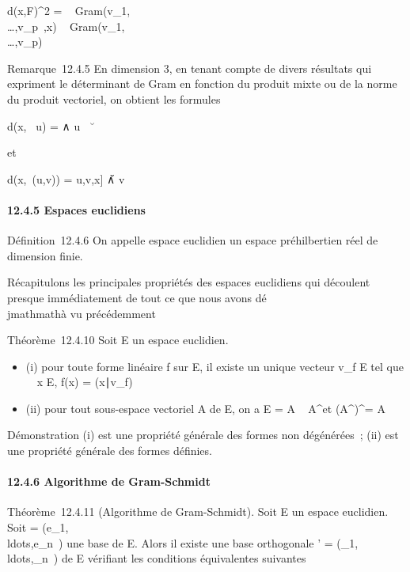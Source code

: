 \documentclass[]{article}
\begin{document}
d(x,F)^2 =
~
Gram(v_1,\\\ldots,v_p~,x)
\over
{}~
Gram(v_1,\\\ldots,v_p)~

Remarque~12.4.5 En dimension 3, en tenant compte de divers résultats qui
expriment le déterminant de Gram en fonction du produit mixte ou de la
norme du produit vectoriel, on obtient les formules

d(x, ~u) = \x ∧ u\
\over
\u\

et

d(x,\mathrmVect~(u,v)) =
\big  {[}u,v,x{]} \big
 \over \u ∧
v\

\paragraph{12.4.5 Espaces euclidiens}

Définition~12.4.6 On appelle espace euclidien un espace préhilbertien
réel de dimension finie.

Récapitulons les principales propriétés des espaces euclidiens qui
découlent presque immédiatement de tout ce que nous avons dé\\jmathmathà vu
précédemment

Théorème~12.4.10 Soit E un espace euclidien.

\begin{itemize}
\itemsep1pt\parskip0pt
\item
  (i) pour toute forme linéaire f sur E, il existe un unique vecteur
  v_f \in E tel que \forall~~x \in E, f(x) =
  (x∣v_f)
\item
  (ii) pour tout sous-espace vectoriel A de E, on a E = A \oplus~
  A^\bot et (A^\bot)^\bot = A
\end{itemize}

Démonstration (i) est une propriété générale des formes non dégénérées~;
(ii) est une propriété générale des formes définies.

\paragraph{12.4.6 Algorithme de Gram-Schmidt}

Théorème~12.4.11 (Algorithme de Gram-Schmidt). Soit E un espace
euclidien. Soit  =
(e_1,\\ldots,e_n~)
une base de E. Alors il existe une base orthogonale ' =
(\epsilon_1,\\ldots,\epsilon_n~)
de E vérifiant les conditions équivalentes suivantes
\end{document}
